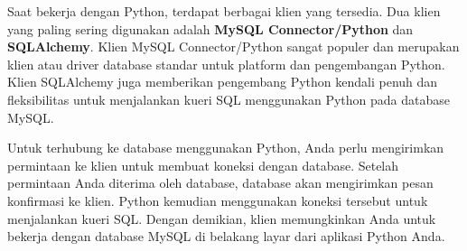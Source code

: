 \documentclass{article}
\begin{document}
Saat bekerja dengan Python, terdapat berbagai klien yang tersedia. Dua klien yang paling sering digunakan adalah \textbf{MySQL Connector/Python} dan \textbf{SQLAlchemy}. Klien MySQL Connector/Python sangat populer dan merupakan klien atau driver database standar untuk platform dan pengembangan Python. Klien SQLAlchemy juga memberikan pengembang Python kendali penuh dan fleksibilitas untuk menjalankan kueri SQL menggunakan Python pada database MySQL.

Untuk terhubung ke database menggunakan Python, Anda perlu mengirimkan permintaan ke klien untuk membuat koneksi dengan database. Setelah permintaan Anda diterima oleh database, database akan mengirimkan pesan konfirmasi ke klien. Python kemudian menggunakan koneksi tersebut untuk menjalankan kueri SQL. Dengan demikian, klien memungkinkan Anda untuk bekerja dengan database MySQL di belakang layar dari aplikasi Python Anda.
\end{document}
